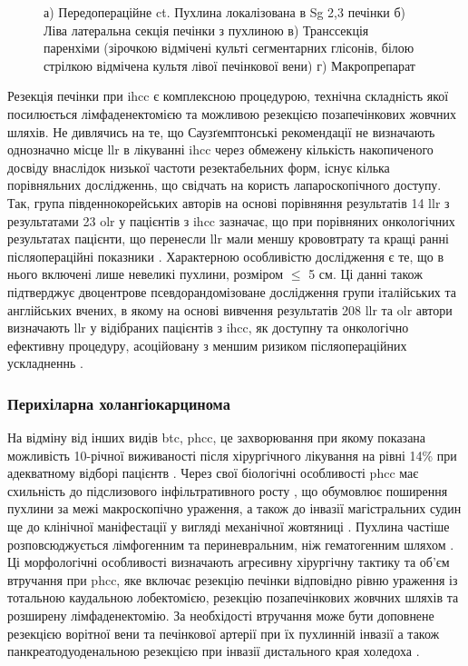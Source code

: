 \begin{refsection}
\begin{figure}[htbp]
\medskip
\small
а) Передопераційне \acrshort{ct}. Пухлина локалізована в Sg 2,3 печінки б) Ліва латеральна секція печінки з пухлиною  в) Транссекція паренхіми (зірочкою відмічені культі сегментарних глісонів, білою стрілкою відмічена культя лівої печінкової вени)  г) Макропрепарат 

\end{figure}

Резекція печінки при \acrshort{ihcc} є комплексною процедурою, технічна складність якої посилюється лімфаденектомією та можливою резекцією позапечінкових жовчних шляхів. Не дивлячись на те, що Саузґемптонські рекомендації не визначають однозначно місце \acrshort{llr} в лікуванні \acrshort{ihcc} через обмежену кількість накопиченого досвіду внаслідок низької частоти резектабельних форм, існує кілька порівняльних дослідженнь, що свідчать на користь лапароскопічного доступу. Так, група південнокорейських авторів на основі порівняння результатів 14 \acrshort{llr} з результатами 23 \acrshort{olr} у пацієнтів з \acrshort{ihcc} зазначає, що при порівняних онкологічних результатах пацієнти, що перенесли \acrshort{llr} мали меншу крововтрату та кращі ранні післяопераційні показники \cite{Lee2016a}. Характерною особливістю дослідження є те, що в нього включені лише невеликі пухлини, розміром $\leq$ 5 см. Ці данні також підтверджує двоцентрове псевдорандомізоване дослідження групи італійських та англійських вчених, в якому на основі вивчення результатів 208 \acrshort{llr} та \acrshort{olr} автори визначають \acrshort{llr} у відібраних пацієнтів  з \acrshort{ihcc}, як доступну та онкологічно ефективну процедуру, асоційовану з меншим ризиком післяопераційних ускладненнь \cite{Ratti2020}.


\subsubsection{Перихіларна холангіокарцинома}

На відміну від інших видів \acrshort{btc}, \acrshort{phcc}, це захворювання при якому показана можливість 10-річної виживаності після хірургічного лікування на рівні 14\% при адекватному відборі пацієнтв \cite{Juntermanns2019}. Через свої біологічні особливості \acrshort{phcc} має схильність до підслизового інфільтративного росту \cite{Sakamoto1998}, що обумовлює поширення пухлини за межі макроскопічно ураження, а також до інвазії магістральних судин ще до клінічної маніфестації у вигляді механічної жовтяниці \cite{Shimada2003}. Пухлина частіше розповсюджується лімфогенним та периневральним, ніж гематогенним шляхом \cite{Zimmermann2017}. Ці морфологічні особливості визначають агресивну хірургічну тактику та об'єм  втручання при \acrshort{phcc}, яке включає резекцію печінки відповідно рівню ураження із тотальною каудальною лобектомією, резекцію позапечінкових жовчних шляхів та розширену лімфаденектомію. За необхідості втручання може бути доповнене резекцією ворітної вени та печінкової артерії при їх пухлинній інвазії а також панкреатодуоденальною резекцією при інвазії дистального края холедоха \cite{Mizuno2019}. 


\end{refsection}
